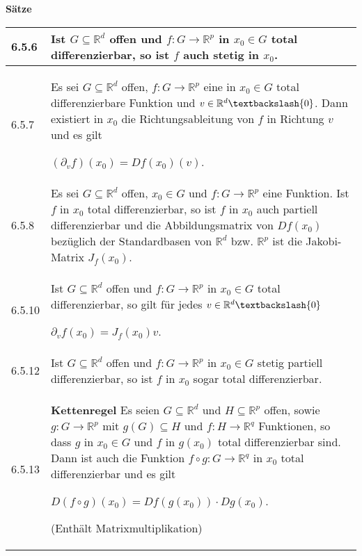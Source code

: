     \noindent 
    \textbf{Sätze}
    \begin{table}[H]
    \begin{tabularx}{\textwidth}{X m{16cm}}
        \toprule

        6.5.6 & Ist $G \subseteq \mathbb{R}^d$ offen und $f: G\rightarrow \mathbb{R}^p$ in $x_0 \in G$ total differenzierbar, so ist $f$ auch
                stetig in $x_0$. \\
        \midrule
        6.5.7 & Es sei $G \subseteq \mathbb{R}^d$ offen, $f: G \rightarrow \mathbb{R}^p$ eine in $x_0 \in G$ total differenzierbare Funktion und
                $v \in \mathbb{R}^d \textbackslash \{0\}$. Dann existiert in $x_0$ die Richtungsableitung von $f$ in Richtung $v$ und es gilt \hfill \break
                \centerline{$ (\partial_vf)(x_0) = Df(x_0)(v)$.} \\
        \midrule
        6.5.8 & Es sei $G \subseteq \mathbb{R}^d$ offen, $x_0 \in G$ und $f: G \rightarrow \mathbb{R}^p$ eine Funktion. Ist $f$ in $x_0$ total
                differenzierbar, so ist $f$ in $x_0$ auch partiell differenzierbar und die Abbildungsmatrix von $Df(x_0)$ bezüglich der Standardbasen
                von $\mathbb{R}^d$ bzw. $\mathbb{R}^p$ ist die Jakobi-Matrix $J_f(x_0)$. \\
        \midrule
        6.5.10& Ist $G \subseteq \mathbb{R}^d$ offen und $f: G\rightarrow \mathbb{R}^p$ in $x_0 \in G$ total differenzierbar, so gilt für jedes
                $ v \in \mathbb{R}^d \textbackslash \{0\}$ \hfill \break
                \centerline{$ \partial_vf(x_0) = J_f(x_0)v $.} \\
        \midrule
        6.5.12& Ist $G \subseteq \mathbb{R}^d$ offen und $f: G\rightarrow \mathbb{R}^p$ in $x_0 \in G$ stetig partiell differenzierbar, so ist
                $f$ in $x_0$ sogar total differenzierbar. \\
        \midrule
        6.5.13& \textbf{Kettenregel} \hfill \break
                Es seien $G \subseteq \mathbb{R}^d$ und $H \subseteq \mathbb{R}^p$ offen, sowie $g : G\rightarrow \mathbb{R}^p$ mit $g(G) \subseteq H$
                und $f: H \rightarrow \mathbb{R}^q$ Funktionen, so dass $g$ in $x_0 \in G$ und $f$ in $g(x_0)$ total differenzierbar sind. Dann ist 
                auch die Funktion $f \circ g : G \rightarrow \mathbb{R}^q$ in $x_0$ total differenzierbar und es gilt \hfill \break
                \centerline{$ D(f\circ g)(x_0) = Df(g(x_0)) \cdot Dg(x_0) $.} 
                (Enthält Matrixmultiplikation)\\
        \midrule

\end{tabularx}
\end{table}
